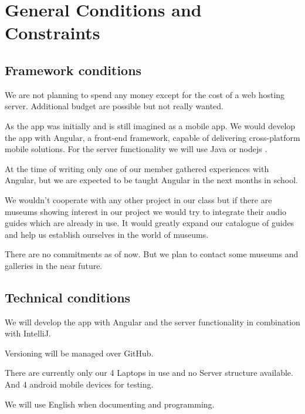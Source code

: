 \documentclass[12pt]{article}
\theoremstyle{definition}
\newenvironment{text}{
}{}
\begin{document}
\pagebreak
 
\section{General Conditions and Constraints}

\subsection{Framework conditions} 
\begin{text}

We are not planning to spend any money except for the cost of a web hosting server. Additional budget are possible but not really wanted.\newline

As the app was initially and is still imagined as a mobile app. We would develop the app with Angular, a front-end framework, capable of delivering cross-platform mobile solutions. For the server functionality we will use Java or nodejs .\newline
 
At the time of writing only one of our member gathered experiences with Angular, but we are expected to be taught Angular in the next months in school.\newline
 
We wouldn't cooperate with any other project in our class but if there are museums showing interest in our project we would try to integrate their audio guides
which are already in use. It would greatly expand our catalogue of guides and help us establish ourselves in the world of museums.\newline
 
There are no commitments as of now. But we plan to contact some museums and galleries in the near future.

\end{text}

\subsection{Technical conditions}
\begin{text}

We will develop the app with Angular and the server functionality in combination with IntelliJ.

Versioning will be managed over GitHub.\newline
 
There are currently only our 4 Laptops in use and no Server structure available. And 4 android mobile devices for testing.\newline
 
We will use English when documenting and programming.

\end{text}
  
\end{document}
